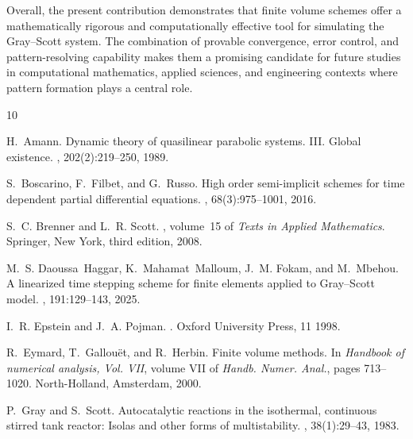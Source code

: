 \documentclass[11pt, a4paper]{amsart}
\numberwithin{equation}{section}
\begin{document}
	
	Overall, the present contribution demonstrates that finite volume schemes offer a mathematically rigorous and computationally effective tool for simulating the Gray--Scott system. The combination of provable convergence, error control, and pattern-resolving capability makes them a promising candidate for future studies in computational mathematics, applied sciences, and engineering contexts where pattern formation plays a central role.


\begin{thebibliography}{10}
	
	H.~Amann.
	\newblock Dynamic theory of quasilinear parabolic systems. {III}. {G}lobal
	existence.
	, 202(2):219--250, 1989.
	
	S.~Boscarino, F.~Filbet, and G.~Russo.
	\newblock High order semi-implicit schemes for time dependent partial
	differential equations.
	, 68(3):975--1001, 2016.
	
	S.~C. Brenner and L.~R. Scott.
	, volume~15 of
	{\em Texts in Applied Mathematics}.
	\newblock Springer, New York, third edition, 2008.
	
	M.~S. Daoussa~Haggar, K.~Mahamat~Malloum, J.~M. Fokam, and M.~Mbehou.
	\newblock A linearized time stepping scheme for finite elements applied to
	{G}ray--{S}cott model.
	, 191:129--143, 2025.
	
	I.~R. Epstein and J.~A. Pojman.
	.
	\newblock Oxford University Press, 11 1998.
	
	R.~Eymard, T.~Gallou\"et, and R.~Herbin.
	\newblock Finite volume methods.
	\newblock In {\em Handbook of numerical analysis, {V}ol. {VII}}, volume VII of
	{\em Handb. Numer. Anal.}, pages 713--1020. North-Holland, Amsterdam, 2000.
	
	P.~Gray and S.~Scott.
	\newblock Autocatalytic reactions in the isothermal, continuous stirred tank
	reactor: Isolas and other forms of multistability.
	, 38(1):29--43, 1983.
	

\end{thebibliography}
\end{document}
